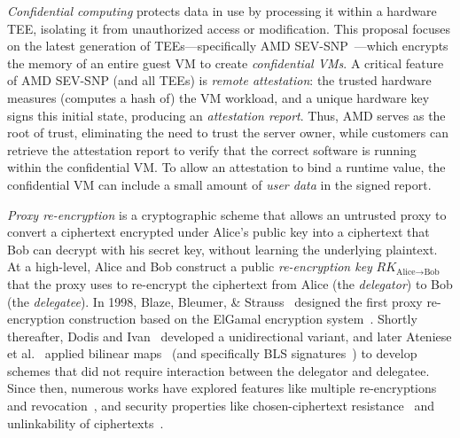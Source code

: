 %
\emph{Confidential computing} protects data in use by processing it within a
hardware TEE, isolating it from unauthorized access or modification.
%
This proposal focuses on the latest generation of TEEs---specifically AMD
SEV-SNP~\cite{amd-sev_snp}---which encrypts the memory of an entire guest VM to
create \emph{confidential VMs}.
%
A critical feature of AMD SEV-SNP (and all TEEs) is \emph{remote attestation}:
the trusted hardware measures (computes a hash of) the VM workload, and a
unique hardware key signs this initial state, producing an \emph{attestation
report}.
%
Thus, AMD serves as the root of trust, eliminating the need to trust the server
owner, while customers can retrieve the attestation report to verify that the
correct software is running within the confidential VM\@.
%
To allow an attestation to bind a runtime value, the confidential VM can
include a small amount of \emph{user data} in the signed report.
%
%


%
%
\emph{Proxy re-encryption} is a cryptographic scheme that allows an untrusted
proxy to convert a ciphertext encrypted under Alice's public key into a
ciphertext that Bob can decrypt with his secret key, without learning the
underlying plaintext.
%
At a high-level, Alice and Bob construct a public \emph{re-encryption key}
$RK_{\text{Alice}\rightarrow\text{Bob}}$ that
the proxy uses to re-encrypt the ciphertext from Alice (the \emph{delegator}) to Bob
(the \emph{delegatee}).
%
In 1998, Blaze, Bleumer, \& Strauss~\cite{98-eurocrypt-proxy_cryptography}
designed the first proxy re-encryption construction based on the ElGamal
encryption system~\cite{85-toit-elgamal}.
%
Shortly thereafter, Dodis and Ivan~\cite{03-ndss-proxy_cryptography_revisited}
developed a unidirectional variant, and later Ateniese et
al.~\cite{05-ndss-improved_proxy_reencryption} applied bilinear
maps~\cite{01-crypto-ibe_weil_pairing} (and specifically BLS
signatures~\cite{03-eurocrypt-aggregate_signatures_bilinear_maps}) to develop
schemes that did not require interaction between the delegator and delegatee.
%
Since then, numerous works have explored features like multiple
re-encryptions~\cite{17-tops-fast_proxy_re_encryption} and
revocation~\cite{12-crypto-dynamic_credentials_and_delegation_for_abe}, and
security properties like chosen-ciphertext
resistance~\cite{07-ccs-cca_proxy_re_encryption} and
unlinkability of ciphertexts~\cite{19-acisp-pcs_proxy_reencryption}.


